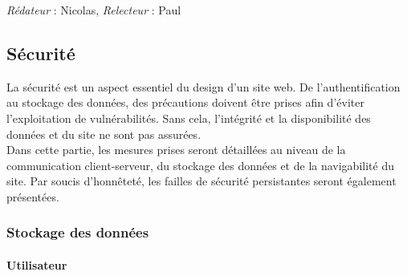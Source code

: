 \documentclass[oneside,a4paper,13pt]{article}
\begin{document}
\smallbreak\textit{Rédateur} : Nicolas, \textit{Relecteur} : Paul
\subsection{Sécurité}

La sécurité est un aspect essentiel du design d'un site web. De l'authentification au stockage des données, des précautions doivent être prises afin d'éviter l'exploitation de vulnérabilités. Sans cela, l'intégrité et la disponibilité des données et du site ne sont pas assurées. \\
Dans cette partie, les mesures prises seront détaillées au niveau de la communication client-serveur, du stockage des données et de la navigabilité du site. Par soucis d'honnêteté, les failles de sécurité persistantes seront également présentées.

\subsubsection{Stockage des données}

\paragraph{Utilisateur}
\end{document}
